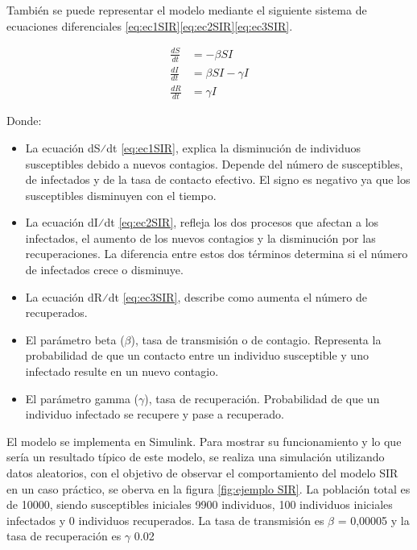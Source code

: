 También se puede representar el modelo mediante el siguiente sistema de ecuaciones diferenciales \eqref{eq:ec1SIR}\eqref{eq:ec2SIR}\eqref{eq:ec3SIR}.

\begin{align}
\frac{dS}{dt} &= -\beta SI \label{eq:ec1SIR} \\
\frac{dI}{dt} &= \beta SI - \gamma I \label{eq:ec2SIR} \\
\frac{dR}{dt} &= \gamma I \label{eq:ec3SIR}
\end{align}

Donde:
\begin{itemize}
    \item 	La ecuación dS⁄dt \eqref{eq:ec1SIR}, explica la disminución de individuos susceptibles debido a nuevos contagios. Depende del número de susceptibles, de infectados y de la tasa de contacto efectivo. El signo es negativo ya que los susceptibles disminuyen con el tiempo.
    \item 	La ecuación dI⁄dt \eqref{eq:ec2SIR}, refleja los dos procesos que afectan a los infectados, el aumento de los nuevos contagios y la disminución por las recuperaciones. La diferencia entre estos dos términos determina si el número de infectados crece o disminuye.
    \item 	La ecuación dR⁄dt \eqref{eq:ec3SIR}, describe como aumenta el número de recuperados. 
    \item El parámetro beta ($\beta$), tasa de transmisión o de contagio. Representa la probabilidad de que un contacto entre un individuo susceptible y uno infectado resulte en un nuevo contagio.
    \item 	El parámetro gamma ($\gamma$), tasa de recuperación. Probabilidad de que un individuo infectado se recupere y pase a recuperado.
\end{itemize}





El modelo se implementa en Simulink. Para mostrar su funcionamiento y lo que sería un resultado típico de este modelo, se realiza una simulación utilizando datos aleatorios, con el objetivo de observar el comportamiento del modelo SIR en un caso práctico, se oberva en la figura \ref{fig:ejemplo SIR}. La población total es de 10000, siendo susceptibles iniciales 9900 individuos, 100 individuos iniciales infectados y 0 individuos recuperados.
La tasa de transmisión es $\beta$ = 0,00005 y la tasa de recuperación es $\gamma$ 0.02



